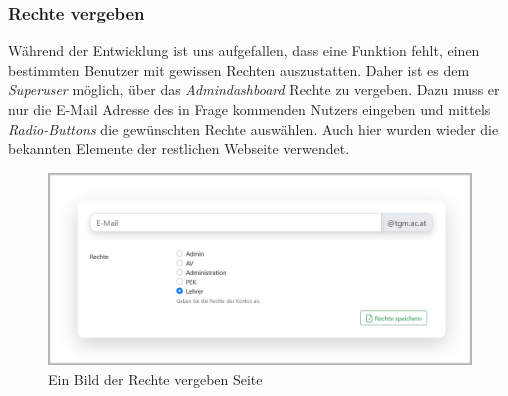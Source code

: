 \subsubsection{Rechte vergeben}
\label{chapter:implementierung-frontend-komponenten-rechte}
Während der Entwicklung ist uns aufgefallen, dass eine Funktion fehlt, einen bestimmten Benutzer mit gewissen Rechten auszustatten. Daher ist es dem \textit{Superuser} möglich, über das \textit{Admindashboard} Rechte zu vergeben. Dazu muss er nur die E-Mail Adresse des in Frage kommenden Nutzers eingeben und mittels \textit{Radio-Buttons} die gewünschten Rechte auswählen. Auch hier wurden wieder die bekannten Elemente der restlichen Webseite verwendet.
\begin{figure}[H]
	\centering
	\includegraphics[width=1\linewidth]{images/ldehner_implementierung/rechte}
	\caption[Rechte vergeben Seite]{Ein Bild der Rechte vergeben Seite}
	\label{fig:rightssite}
\end{figure}